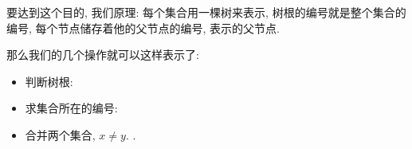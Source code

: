 要达到这个目的, 我们原理: 每个集合用一棵树来表示, 树根的编号就是整个集合的编号, 
每个节点储存着他的父节点的编号, 表示的父节点. 

那么我们的几个操作就可以这样表示了: 
\begin{itemize}
    \item 判断树根: 
    \item 求集合所在的编号: 
    \item 合并两个集合, $x\neq y$. .
\end{itemize}